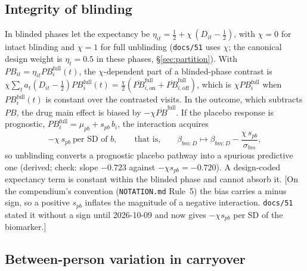\documentclass[11pt]{article}
\newcommand{\note}[1]{\textcolor{blue!60!black}{\small [#1]}}
\newcommand{\code}[1]{\texttt{#1}}
\begin{document}
\subsection{Integrity of blinding}

In blinded phases let the expectancy be $\eta_{it} = \tfrac12 +
\chi\,(D_{it} - \tfrac12)$, with $\chi = 0$ for intact blinding and
$\chi = 1$ for full unblinding (\code{docs/51} uses $\chi$; the
canonical design weight is $\eta_t = 0.5$ in these phases,
\S\ref{sec:partition}). With $PB_{it} = \eta_{it} PB^{\text{full}}_i(t)$, the
$\chi$-dependent part of a blinded-phase contrast is
$\chi\sum_t a_t (D_{it} - \tfrac12) PB^{\text{full}}_i(t) = \tfrac{\chi}{2}(\overline{PB}^{\text{full}}_{i,\text{on}} + \overline{PB}^{\text{full}}_{i,\text{off}})$, which is $\chi PB^{\text{full}}_i$ when
$PB^{\text{full}}_i(t)$ is constant over the contrasted visits. In the outcome,
which subtracts $PB$, the drug main effect is biased by $-\chi\overline{PB}^{\text{full}}$.
If the placebo response is prognostic, $PB^{\text{full}}_i = \mu_{pb} + s_{pb}\, b_i$,
the interaction acquires
\begin{equation}
-\chi\, s_{pb} \ \text{per SD of } b, \qquad\text{that is,}\qquad
\beta_{bm:D} \mapsto \beta_{bm:D} - \frac{\chi\, s_{pb}}{\sigma_{bm}},
\label{eq:pd-unblind}
\end{equation}
so unblinding converts a prognostic placebo pathway into a spurious
predictive one (derived; check: slope $-0.723$ against $-\chi s_{pb}
= -0.720$). A design-coded expectancy term is constant within the
blinded phase and cannot absorb it. \note{On the compendium's
convention (\code{NOTATION.md} Rule~5) the bias carries a minus sign,
so a positive $s_{pb}$ inflates the magnitude of a negative
interaction. \code{docs/51} stated it without a sign until 2026-10-09
and now gives $-\chi s_{pb}$ per SD of the biomarker.}

\subsection{Between-person variation in carryover}
\end{document}
